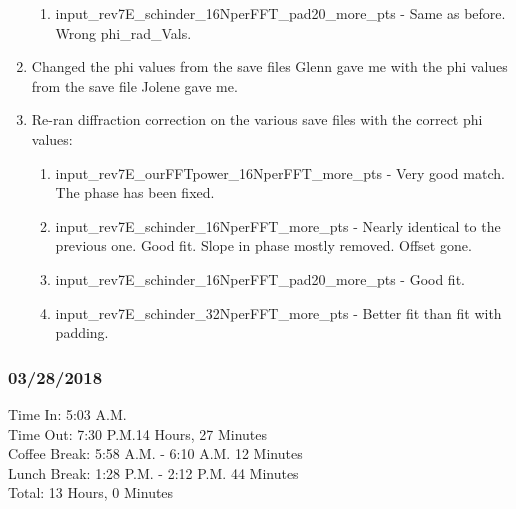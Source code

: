 \documentclass[crop=false,class=book]{standalone}
\begin{document}
\begin{enumerate}
\begin{enumerate}
        \item input\_rev7E\_schinder\_16NperFFT\_pad20\_more\_pts - Same as before. Wrong phi\_rad\_Vals.
    \end{enumerate}
    \item Changed the phi values from the save files Glenn gave me with the phi values from the save file Jolene gave me.
    \item Re-ran diffraction correction on the various save files with the correct phi values:
    \begin{enumerate}
        \item input\_rev7E\_ourFFTpower\_16NperFFT\_more\_pts - Very good match. The phase has been fixed.
        \item input\_rev7E\_schinder\_16NperFFT\_more\_pts - Nearly identical to the previous one. Good fit. Slope in phase mostly removed. Offset gone.
        \item input\_rev7E\_schinder\_16NperFFT\_pad20\_more\_pts - Good fit.
        \item input\_rev7E\_schinder\_32NperFFT\_more\_pts - Better fit than fit with padding.
    \end{enumerate}
\end{enumerate}
\subsubsection{\footnotesize 03/28/2018}
Time In: 5:03 A.M.\\
Time Out: 7:30 P.M.\hfill 14 Hours, 27 Minutes\\
Coffee Break: 5:58 A.M. - 6:10 A.M. \hfill 12 Minutes\\
Lunch Break: 1:28 P.M. - 2:12 P.M. \hfill 44 Minutes\\
Total: \hfill 13 Hours, 0 Minutes
\end{document}
